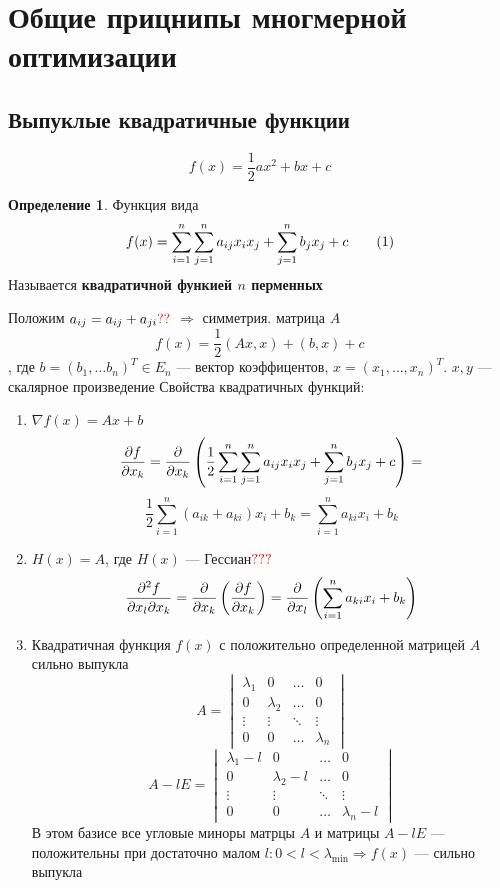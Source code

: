 \documentclass[english]{article}
\newcommand\addtag{\refstepcounter{equation}\tag{\theequation}}
\theoremstyle{plain}
\theoremstyle{remark}
\theoremstyle{definition}
\newtheorem*{definition}{Определение}
\begin{document}
\section{Общие прицнипы многмерной оптимизации}
\label{sec:org11fb971}
\subsection{Выпуклые квадратичные функции}
\label{sec:org0b9b4a5}
\[ f(x) = \frac{1}{2}ax^2 + bx + c \]
\begin{definition}
Функция вида
\[ f(x) = \sum^n_{i = 1}\sum^n_{j = 1}a_{ij}x_ix_j + \sum^n_{j = 1}b_j x_j + c \addtag\label{7_1_quad} \]
Называется \textbf{квадратичной функией \(n\) перменных}
\end{definition}
Положим \(a_{ij} = a_{ij} + a_{ji} {\color{red}??}\) \(\Rightarrow\) симметрия. матрица \(A\)
\[ f(x) = \frac{1}{2}(Ax, x) + (b, x) + c \]
, где \(b = (b_1, \dots b_n)^T \in E_n\) --- вектор коэффицентов, \(x = (x_1, \dots, x_n)^T\). \(x, y\) --- скалярное произведение
Свойства квадратичных функций:
\begin{enumerate}
\item \(\nabla f(x) = Ax + b\)
\[ \frac{\partial f}{\partial x_k} = \frac{\partial }{\partial x_k}\left(\frac{1}{2}\sum^n_{i = 1}\sum^n_{j = 1}a_{ij}x_ix_j + \sum^n_{j = 1}b_j x_j + c\right) = \]
\[ \frac{1}{2}\sum^n_{i = 1}(a_{ik} + a_{ki})x_i + b_k = \sum^n_{i = 1} a_{ki}x_i + b_k \]
\item \(H(x) = A\), где \(H(x)\) --- Гессиан\(\color{red}???\) 
\[ \frac{\partial ^2 f}{\partial x_l \partial x_k} = \frac{\partial }{\partial x_k}\left(\frac{\partial f}{\partial x_k}\right) = \frac{\partial }{\partial x_l}\left(\sum^n_{i = 1} a_{ki} x_i + b_k\right) \]
\item Квадратичная функция \(f(x)\) с положительно определенной матрицей \(A\) сильно выпукла
\[ A = \begin{vmatrix} \lambda_1 & 0 & \dots & 0 \\ 0 & \lambda_2 & \dots & 0 \\ \vdots & \vdots & \ddots & \vdots \\ 0 & 0 & \dots & \lambda_n \end{vmatrix} \]
\[ A - lE = \begin{vmatrix} \lambda_1 - l & 0 & \dots & 0 \\ 0 & \lambda_2 - l & \dots & 0 \\ \vdots & \vdots & \ddots & \vdots \\ 0 & 0 & \dots & \lambda_n - l \end{vmatrix} \]
В этом базисе все угловые миноры матрцы \(A\) и матрицы \(A - lE\) --- положительны при достаточно малом \(l: 0 < l < \lambda_\min \Rightarrow f(x)\) --- сильно выпукла
\end{enumerate}
\end{document}
